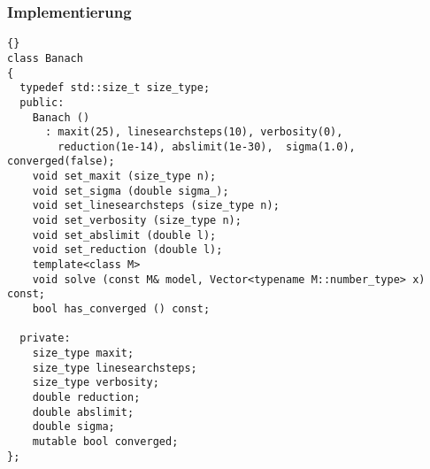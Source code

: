 \documentclass[a4paper,11pt]{article}
\theoremstyle{definition}
\begin{document}
\subsubsection{Implementierung}
{\footnotesize{\begin{lstlisting}{}
class Banach
{
  typedef std::size_t size_type;
  public:
    Banach ()
      : maxit(25), linesearchsteps(10), verbosity(0),
        reduction(1e-14), abslimit(1e-30),  sigma(1.0), converged(false);
    void set_maxit (size_type n);
    void set_sigma (double sigma_);
    void set_linesearchsteps (size_type n);
    void set_verbosity (size_type n);
    void set_abslimit (double l);
    void set_reduction (double l);
    template<class M>
    void solve (const M& model, Vector<typename M::number_type> x) const;
    bool has_converged () const;

  private:
    size_type maxit;
    size_type linesearchsteps;
    size_type verbosity;
    double reduction;
    double abslimit;
    double sigma;
    mutable bool converged;
};
\end{lstlisting}}}
\end{document}
